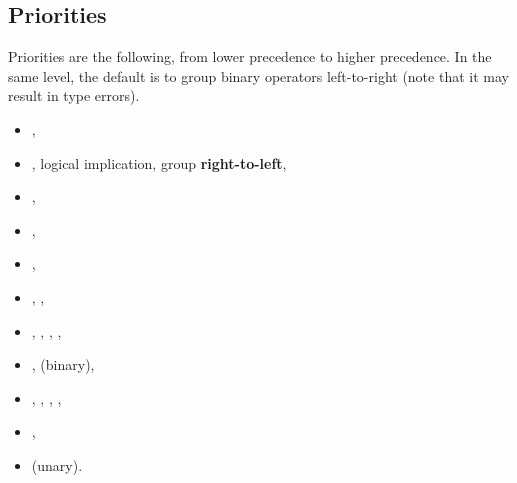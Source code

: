 \identref


\subsection{Priorities}

Priorities are the following, from lower precedence to higher precedence.
In the same level, the default is to group binary operators left-to-right
(note that it may result in type errors).

\begin{itemize}
\item {},
\item \bnftoken{=>}, logical implication, group {\bf right-to-left},
\item {},
\item {},
\item {},
\item \bnftoken{=}, \bnftoken{<>},
\item \bnftoken{>}, \bnftoken{<}, \bnftoken{>=}, \bnftoken{<=},
\item \bnftoken{+}, \bnftoken{-} (binary),
\item \bnftoken{*}, \bnftoken{/}, , ,
\item {},
\item \bnftoken{-} (unary).
\end{itemize}


